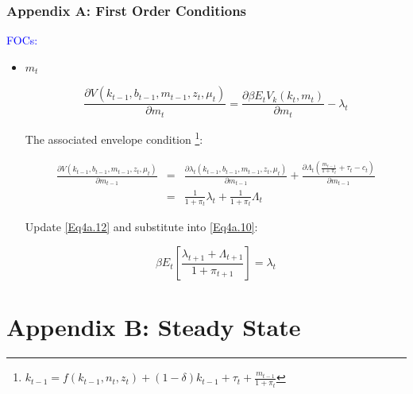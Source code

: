 \begin{frame}
\frametitle{Appendix A: First Order Conditions} \vskip 0.1in
\textcolor{blue}{FOCs:}

\begin{itemize}
\item $m_{t}$

\begin{equation}\label{Eq4a.10}
\frac{\partial V(k_{t-1}, b_{t-1}, m_{t-1}, z_{t},
\mu_{t})}{\partial m_{t}} = \frac{\partial \beta E_{t} V_{k}(k_{t},
m_{t})}{\partial m_{t}} - \lambda_{t}
\end{equation}

{\scriptsize{

The associated envelope condition
\footnote{$k_{t-1}=f(k_{t-1},n_{t},z_{t})+(1-\delta)k_{t-1}+\tau_{t}+\frac{m_{t-1}}{1+\pi_{t}}$}:

\begin{eqnarray}
\frac{\partial V(k_{t-1}, b_{t-1}, m_{t-1}, z_{t},
\mu_{t})}{\partial m_{t-1}} &=& \frac{\partial \lambda_{t}(k_{t-1},
b_{t-1}, m_{t-1}, z_{t}, \mu_{t})}{\partial m_{t-1}} +
\frac{\partial
\Lambda_{t}(\frac{m_{t-1}}{1+\pi_{t}}+\tau_{t}-c_{t})}{\partial
m_{t-1}} \label{Eq4a.11}\\
 &=&
\frac{1}{1+\pi_{t}}\lambda_{t} +
\frac{1}{1+\pi_{t}}\Lambda_{t}\label{Eq4a.12}
\end{eqnarray}

Update \eqref{Eq4a.12} and substitute into \eqref{Eq4a.10}:

\begin{equation}\label{Eq4a.13}
\beta E_{t} [\frac{\lambda_{t+1}+\Lambda_{t+1}}{1+\pi_{t+1}}] =
\lambda_{t}
\end{equation}}}
\end{itemize}

\end{frame}



\renewcommand{\theequation}{B.\arabic{equation}}
\setcounter{equation}{0}

\section{Appendix B: Steady State}

